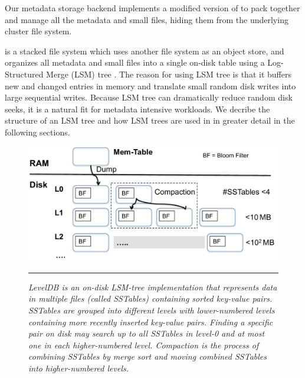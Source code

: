 Our metadata storage backend implements a modified version of \tfs
to pack together and manage all the metadata and small files,
hiding them from the underlying cluster file system.

\tfs \cite{TableFS} is a stacked file system which uses another file system
as an object store, and organizes all metadata and small files into a single
on-disk table using a Log-Structured Merge (LSM) tree \cite{ONeil1996, LevelDB}.
The reason for using LSM tree is that it buffers new and changed entries in
memory and translate small random disk writes into large sequential writes.
Because LSM tree can dramatically reduce random disk seeks,
it is a natural fit for metadata intensive workloads.
We decribe the structure of an LSM tree
and how LSM trees are used in \tfs in greater detail
in the following sections.

\begin{figure}[t]
\center
\includegraphics[scale=0.4]{figs/leveldb}
\vspace{10pt}
\caption{\textit{
LevelDB is an on-disk LSM-tree implementation that represents data in multiple 
files (called SSTables) containing sorted key-value pairs.
SSTables are grouped into different levels with lower-numbered levels
containing more recently inserted key-value pairs.
Finding a specific pair on disk may search up to all SSTables in level-0
and at most one in each higher-numbered level.
Compaction is the process of combining SSTables
by merge sort and moving combined SSTables into higher-numbered levels.
}}
\hrule
\label{fig:leveldb}
\end{figure}


